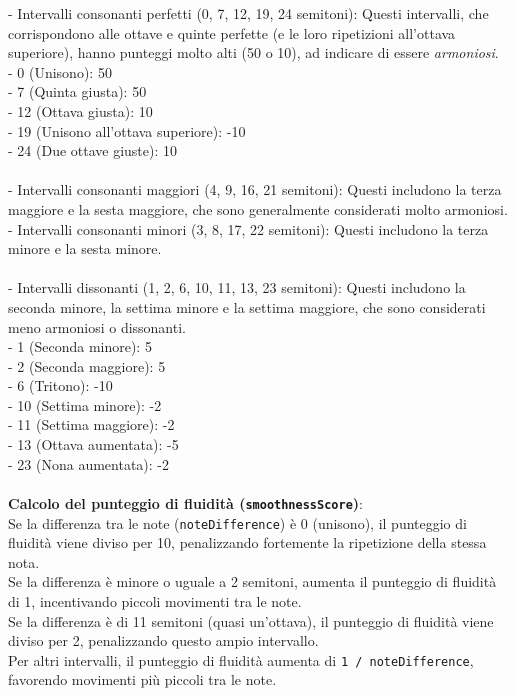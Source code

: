 \documentclass[a4paper,12pt]{report}
\begin{document}
- Intervalli consonanti perfetti (0, 7, 12, 19, 24 semitoni): Questi intervalli, che corrispondono alle ottave e quinte perfette (e le loro ripetizioni all'ottava superiore), hanno punteggi molto alti (50 o 10), ad indicare di essere \textit{armoniosi}. \\
    - 0 (Unisono): 50 \\
    - 7 (Quinta giusta): 50 \\
    - 12 (Ottava giusta): 10 \\
    - 19 (Unisono all'ottava superiore): -10 \\
    - 24 (Due ottave giuste): 10 \\
\\
- Intervalli consonanti maggiori (4, 9, 16, 21 semitoni): Questi includono la terza maggiore e la sesta maggiore, che sono generalmente considerati molto armoniosi. \\
- Intervalli consonanti minori (3, 8, 17, 22 semitoni): Questi includono la terza minore e la sesta minore. \\
\\
- Intervalli dissonanti (1, 2, 6, 10, 11, 13, 23 semitoni): Questi includono la seconda minore, la settima minore e la settima maggiore, che sono considerati meno armoniosi o dissonanti. \\
    - 1 (Seconda minore): 5 \\
    - 2 (Seconda maggiore): 5 \\
    - 6 (Tritono): -10 \\
    - 10 (Settima minore): -2 \\
    - 11 (Settima maggiore): -2 \\
    - 13 (Ottava aumentata): -5 \\
    - 23 (Nona aumentata): -2 \\
\\
\textbf{Calcolo del punteggio di fluidità (\texttt{smoothnessScore})}: \\
Se la differenza tra le note (\texttt{noteDifference}) è 0 (unisono), il punteggio di fluidità viene diviso per 10, penalizzando fortemente la ripetizione della stessa nota. \\
Se la differenza è minore o uguale a 2 semitoni, aumenta il punteggio di fluidità di 1, incentivando piccoli movimenti tra le note. \\
Se la differenza è di 11 semitoni (quasi un'ottava), il punteggio di fluidità viene diviso per 2, penalizzando questo ampio intervallo. \\
Per altri intervalli, il punteggio di fluidità aumenta di \texttt{1 / noteDifference}, favorendo movimenti più piccoli tra le note. \\
\end{document}
